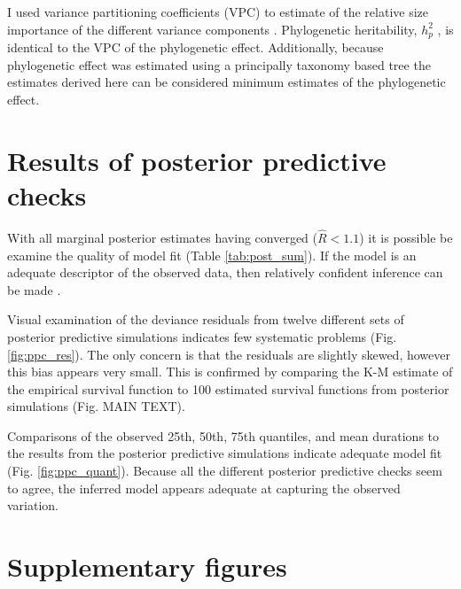 \documentclass{article}
\begin{document}
I used variance partitioning coefficients (VPC) to estimate of the relative size importance of the different variance components \cite{Gelman2007}. Phylogenetic heritability, \(h_{p}^{2}\) \cite{Lynch1991,Housworth2004}, is identical to the VPC of the phylogenetic effect. Additionally, because phylogenetic effect was estimated using a principally taxonomy based tree the estimates derived here can be considered minimum estimates of the phylogenetic effect.


\section{Results of posterior predictive checks}
With all marginal posterior estimates having converged (\(\hat{R} < 1.1\)) it is possible be examine the quality of model fit (Table \ref{tab:post_sum}). If the model is an adequate descriptor of the observed data, then relatively confident inference can be made \cite{Gelman2013d}.

Visual examination of the deviance residuals from twelve different sets of posterior predictive simulations indicates few systematic problems (Fig. \ref{fig:ppc_res}). The only concern is that the residuals are slightly skewed, however this bias appears very small. This is confirmed by comparing the K-M estimate of the empirical survival function to 100 estimated survival functions from posterior simulations (Fig. MAIN TEXT).

Comparisons of the observed 25th, 50th, 75th quantiles, and mean durations to the results from the posterior predictive simulations indicate adequate model fit (Fig. \ref{fig:ppc_quant}). Because all the different posterior predictive checks seem to agree, the inferred model appears adequate at capturing the observed variation.



\clearpage

\section{Supplementary figures}
\end{document}
